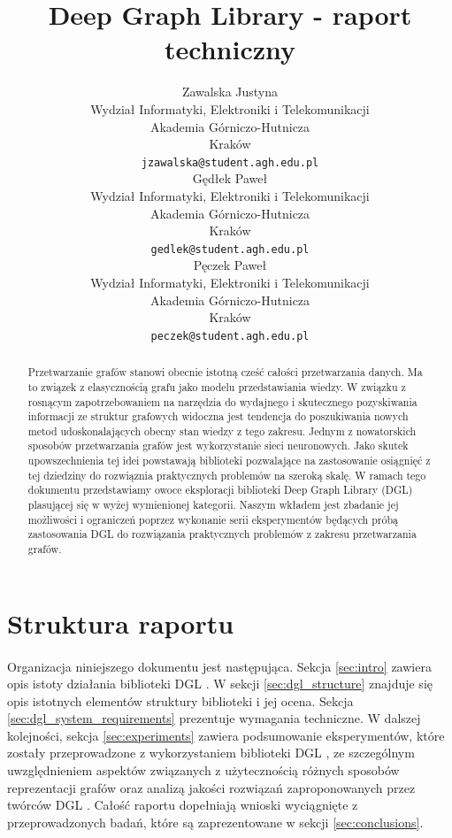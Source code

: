 \documentclass{article}
\title{Deep Graph Library - raport techniczny}
\author{
 Zawalska Justyna \\
  Wydział Informatyki, Elektroniki i Telekomunikacji\\
  Akademia Górniczo-Hutnicza \\
  Kraków \\
  \texttt{jzawalska@student.agh.edu.pl} \\
  \And
 Gędłek Paweł \\
  Wydział Informatyki, Elektroniki i Telekomunikacji\\
  Akademia Górniczo-Hutnicza \\
  Kraków \\
  \texttt{gedlek@student.agh.edu.pl} \\
  \And
 Pęczek Paweł \\
  Wydział Informatyki, Elektroniki i Telekomunikacji\\
  Akademia Górniczo-Hutnicza \\
  Kraków \\
  \texttt{peczek@student.agh.edu.pl} \\
}
\begin{document}
\maketitle
\begin{abstract}
Przetwarzanie grafów stanowi obecnie istotną cześć całości przetwarzania danych. Ma to związek z elasycznością grafu jako modelu przedstawiania wiedzy. W związku z rosnącym zapotrzebowaniem na narzędzia do wydajnego i skutecznego pozyskiwania informacji ze struktur grafowych widoczna jest tendencja do poszukiwania nowych metod udoskonalających obecny stan wiedzy z tego zakresu. Jednym z nowatorskich sposobów przetwarzania grafów jest wykorzystanie sieci neuronowych. Jako skutek upowszechnienia tej idei powstawają biblioteki pozwalające na zastosowanie osiągnięć z tej dziedziny do rozwiąznia praktycznych problemów na szeroką skalę. W ramach tego dokumentu przedstawiamy owoce eksploracji biblioteki Deep Graph Library (DGL) plasującej się w wyżej wymienionej kategorii. Naszym wkładem jest zbadanie jej możliwości i ograniczeń poprzez wykonanie serii eksperymentów będących próbą zastosowania DGL do rozwiązania praktycznych problemów z zakresu przetwarzania grafów.
\end{abstract}




\section{Struktura raportu}
\label{sec:report_structure}
\paragraph{}
Organizacja niniejszego dokumentu jest następująca. Sekcja \ref{sec:intro} zawiera opis istoty działania biblioteki DGL \cite{dgl}. W sekcji \ref{sec:dgl_structure} znajduje się opis istotnych elementów struktury biblioteki i jej ocena. Sekcja \ref{sec:dgl_system_requirements} prezentuje wymagania techniczne. W dalszej kolejności, sekcja \ref{sec:experiments} zawiera podsumowanie eksperymentów, które zostały przeprowadzone z wykorzystaniem biblioteki DGL \cite{dgl}, ze szczególnym uwzględnieniem aspektów związanych z użytecznością różnych sposobów reprezentacji grafów oraz analizą jakości rozwiązań zaproponowanych przez twórców DGL \cite{dgl}. Całość raportu dopełniają wnioski wyciągnięte z przeprowadzonych badań, które są zaprezentowane w sekcji \ref{sec:conclusions}.
\end{document}
